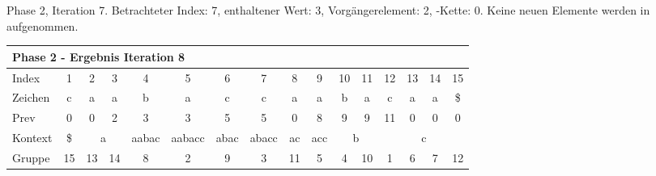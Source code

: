 \begin{table}[H]
\caption[Phase 2, Iteration 7]{Phase 2, Iteration 7. Betrachteter Index: 7, enthaltener Wert: 3, Vorgängerelement: 2, \prevpointer-Kette: 0. Keine neuen Elemente werden in \sa aufgenommen.}
\label{table_complex_example_2_7} 
\end{table}

\begin{table}[H]
\centering
\begin{adjustbox}{max width=\textwidth}
\centering
\begin{tabular}{lccccccccccccccc}
\multicolumn{16}{l}{Phase 2 - Ergebnis Iteration 8}                                                                                                                                                                                                                                                                                                                   \\ \hline
\multicolumn{1}{l|}{Index}   & 1                       & 2  & 3                       & 4                          & 5                           & 6                         & 7                          & 8                                               & 9                        & 10                         & 11                      & 12  & 13  & 14  & 15  \\
\multicolumn{1}{l|}{Zeichen} & c                       & a  & a                       & b                          & a                           & c                         & c                          & a                                               & a                        & b                          & a                       & c   & a   & a   & \$  \\
\multicolumn{1}{l|}{Prev}    & 0                       & 0  & 2                       & 3                          & 3                           & 5                         & 5                          & 0                                               & 8                        & 9                          & 9                       & 11  & 0   & 0   & 0   \\ \hline
\multicolumn{1}{l|}{Kontext} & \multicolumn{1}{c|}{\$} & \multicolumn{2}{c|}{a}       & \multicolumn{1}{c|}{aabac} & \multicolumn{1}{c|}{aabacc} & \multicolumn{1}{c|}{abac} & \multicolumn{1}{c|}{abacc} & \multicolumn{1}{c|}{ac}                         & \multicolumn{1}{c|}{acc} & \multicolumn{2}{c|}{b}                               & \multicolumn{4}{c}{c} \\
\multicolumn{1}{l|}{Gruppe}  & \multicolumn{1}{c|}{15} & 13 & \multicolumn{1}{c|}{14} & \multicolumn{1}{c|}{8}     & \multicolumn{1}{c|}{2}      & \multicolumn{1}{c|}{9}    & \multicolumn{1}{c|}{3}     & \multicolumn{1}{c|}{11}                         & \multicolumn{1}{c|}{5}   & 4                          & \multicolumn{1}{c|}{10} & 1   & 6   & 7   & 12  \\

\end{tabular}
\end{adjustbox}
\end{table}
